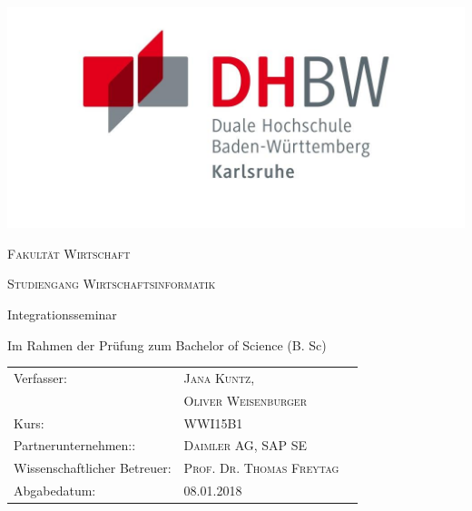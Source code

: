 \begin{titlepage}
	\centering
	
	\includegraphics{pictures/dhbw_logo.png}
	\vspace{1cm}
	\par
	{\scshape\LARGE Fakultät Wirtschaft\par}
	\vspace{1cm}
	{\scshape\Large Studiengang Wirtschaftsinformatik\par}
	\vspace{1.5cm}
	{\large\bfseries \ThesisTitle \par}
	\vspace{2cm}
	{\Large Integrationsseminar\par}
	\vfill
	{ Im Rahmen der Prüfung zum Bachelor of Science (B. Sc) \par}
	\vfill
	
	\vfill
	
	\begin{center}
	\begin{tabularx}{\columnwidth}{XXl}
	Verfasser: &  \textsc{Jana Kuntz,} \\
	&\textsc{Oliver Weisenburger} \\
	Kurs: & \textsc{WWI15B1} \\
	Partnerunternehmen:: & \textsc{Daimler AG, SAP SE} \\
	Wissenschaftlicher Betreuer: &  \textsc{Prof. Dr. Thomas Freytag} 	\\
	Abgabedatum: & \textsc{08.01.2018} \\
\end{tabularx} 
 \end{center}

\end{titlepage}
